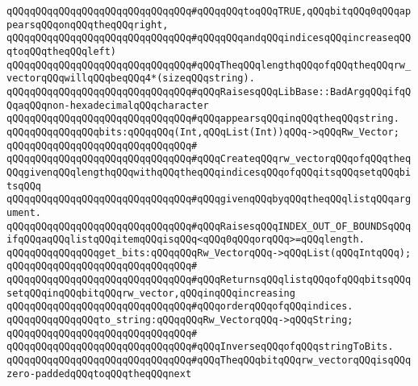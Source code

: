 \verb|qQQqqQQqqQQqqQQqqQQqqQQqqQQqqQQq#qQQqqQQqtoqQQqTRUE,qQQqbitqQQq0qQQqappearsqQQqonqQQqtheqQQqright,|\newline
\verb|qQQqqQQqqQQqqQQqqQQqqQQqqQQqqQQq#qQQqqQQqandqQQqindicesqQQqincreaseqQQqtoqQQqtheqQQqleft)|\newline
\verb|qQQqqQQqqQQqqQQqqQQqqQQqqQQqqQQq#qQQqTheqQQqlengthqQQqofqQQqtheqQQqrw_vectorqQQqwillqQQqbeqQQq4*(sizeqQQqstring).|\newline
\verb|qQQqqQQqqQQqqQQqqQQqqQQqqQQqqQQq#qQQqRaisesqQQqLibBase::BadArgqQQqifqQQqaqQQqnon-hexadecimalqQQqcharacter|\newline
\verb|qQQqqQQqqQQqqQQqqQQqqQQqqQQqqQQq#qQQqappearsqQQqinqQQqtheqQQqstring.|\newline
\newline
\verb|qQQqqQQqqQQqqQQqbits:qQQqqQQq(Int,qQQqList(Int))qQQq->qQQqRw_Vector;|\newline
\verb|qQQqqQQqqQQqqQQqqQQqqQQqqQQqqQQq#|\newline
\verb|qQQqqQQqqQQqqQQqqQQqqQQqqQQqqQQq#qQQqCreateqQQqrw_vectorqQQqofqQQqtheqQQqgivenqQQqlengthqQQqwithqQQqtheqQQqindicesqQQqofqQQqitsqQQqsetqQQqbitsqQQq|\newline
\verb|qQQqqQQqqQQqqQQqqQQqqQQqqQQqqQQq#qQQqgivenqQQqbyqQQqtheqQQqlistqQQqargument.|\newline
\verb|qQQqqQQqqQQqqQQqqQQqqQQqqQQqqQQq#qQQqRaisesqQQqINDEX_OUT_OF_BOUNDSqQQqifqQQqaqQQqlistqQQqitemqQQqisqQQq<qQQq0qQQqorqQQq>=qQQqlength.|\newline
\newline
\verb|qQQqqQQqqQQqqQQqget_bits:qQQqqQQqRw_VectorqQQq->qQQqList(qQQqIntqQQq);|\newline
\verb|qQQqqQQqqQQqqQQqqQQqqQQqqQQqqQQq#|\newline
\verb|qQQqqQQqqQQqqQQqqQQqqQQqqQQqqQQq#qQQqReturnsqQQqlistqQQqofqQQqbitsqQQqsetqQQqinqQQqbitqQQqrw_vector,qQQqinqQQqincreasing|\newline
\verb|qQQqqQQqqQQqqQQqqQQqqQQqqQQqqQQq#qQQqorderqQQqofqQQqindices.|\newline
\newline
\verb|qQQqqQQqqQQqqQQqto_string:qQQqqQQqRw_VectorqQQq->qQQqString;|\newline
\verb|qQQqqQQqqQQqqQQqqQQqqQQqqQQqqQQq#|\newline
\verb|qQQqqQQqqQQqqQQqqQQqqQQqqQQqqQQq#qQQqInverseqQQqofqQQqstringToBits.|\newline
\verb|qQQqqQQqqQQqqQQqqQQqqQQqqQQqqQQq#qQQqTheqQQqbitqQQqrw_vectorqQQqisqQQqzero-paddedqQQqtoqQQqtheqQQqnext|\newline
